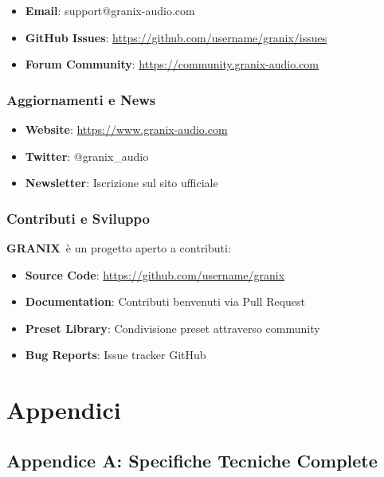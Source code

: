 \documentclass[a4paper,11pt,openany]{book}
\newcommand{\granix}{\textbf{\textcolor{granixblue}{GRANIX}}}
\begin{document}
\begin{itemize}
    \item \textbf{Email}: support@granix-audio.com
    \item \textbf{GitHub Issues}: \url{https://github.com/username/granix/issues}
    \item \textbf{Forum Community}: \url{https://community.granix-audio.com}
\end{itemize}

\subsection{Aggiornamenti e News}

\begin{itemize}
    \item \textbf{Website}: \url{https://www.granix-audio.com}
    \item \textbf{Twitter}: @granix\_audio
    \item \textbf{Newsletter}: Iscrizione sul sito ufficiale
\end{itemize}

\subsection{Contributi e Sviluppo}

\granix\ è un progetto aperto a contributi:

\begin{itemize}
    \item \textbf{Source Code}: \url{https://github.com/username/granix}
    \item \textbf{Documentation}: Contributi benvenuti via Pull Request
    \item \textbf{Preset Library}: Condivisione preset attraverso community
    \item \textbf{Bug Reports}: Issue tracker GitHub
\end{itemize}

\chapter*{Appendici}

\section*{Appendice A: Specifiche Tecniche Complete}
\end{document}
